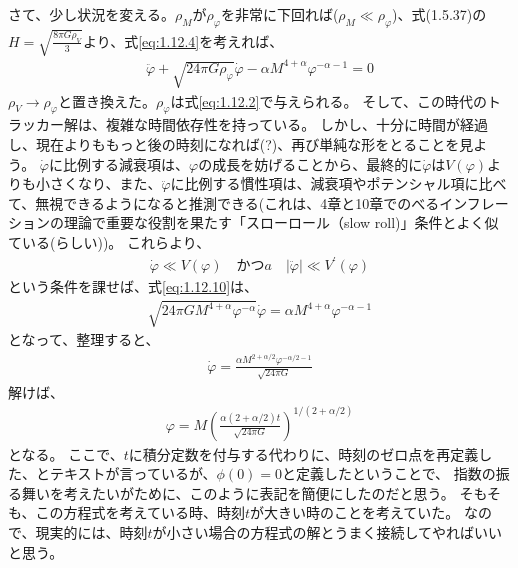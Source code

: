 \documentclass[11pt]{ltjsarticle}
\theoremstyle{plain}
\theoremstyle{break}
\begin{document}
さて、少し状況を変える。$\rho_M$が$\rho_\varphi$を非常に下回れば($\rho_M\ll \rho_{\varphi}$)、式(1.5.37)の$H=\sqrt{\frac{8\pi G \rho_V}{3}}$より、式\eqref{eq:1.12.4}を考えれば、
\begin{align}
  \ddot{\varphi}+\sqrt{24 \pi G \rho_{\varphi}} \dot{\varphi}-\alpha M^{4+\alpha} \varphi^{-\alpha-1}=0 \label{eq:1.12.10}
\end{align}%
$\rho_V \to \rho_\varphi$と置き換えた。$\rho_\varphi$は式\eqref{eq:1.12.2}で与えられる。
そして、この時代のトラッカー解は、複雑な時間依存性を持っている。
しかし、十分に時間が経過し、現在よりももっと後の時刻になれば(?)、再び単純な形をとることを見よう。
$\dot{\varphi}$に比例する減衰項は、$\varphi$の成長を妨げることから、最終的に$\dot{\varphi}$は$V(\varphi)$よりも小さくなり、また、$\ddot{\varphi}$に比例する慣性項は、減衰項やポテンシャル項に比べて、無視できるようになると推測できる(これは、4章と10章でのべるインフレーションの理論で重要な役割を果たす「スローロール（slow roll)」条件とよく似ている(らしい))。
これらより、
\begin{align}
\dot{\varphi} \ll V(\varphi )\quad  かつ  a\quad |\ddot{\varphi}| \ll  V^{\prime}(\varphi)
\end{align}%
という条件を課せば、式\eqref{eq:1.12.10}は、
\begin{align}
  \sqrt{24 \pi G M^{4+\alpha} \varphi^{-\alpha}} \dot{\varphi}=\alpha M^{4+\alpha} \varphi^{-\alpha-1}
\end{align}%
となって、整理すると、
\begin{align}
  \dot{\varphi}=\frac{\alpha M^{2+\alpha / 2} \varphi^{-\alpha / 2-1}}{\sqrt{24 \pi G}}
\end{align}%
解けば、
\begin{align}
  \varphi=M\left(\frac{\alpha(2+\alpha / 2) t}{\sqrt{24 \pi G}}\right)^{1 /(2+\alpha / 2)} \label{eq:1.12.12}
\end{align}%
となる。
ここで、$t$に積分定数を付与する代わりに、時刻のゼロ点を再定義した、とテキストが言っているが、$\phi(0) = 0$と定義したということで、
指数の振る舞いを考えたいがために、このように表記を簡便にしたのだと思う。
そもそも、この方程式を考えている時、時刻$t$が大きい時のことを考えていた。
なので、現実的には、時刻$t$が小さい場合の方程式の解とうまく接続してやればいいと思う。
\end{document}
